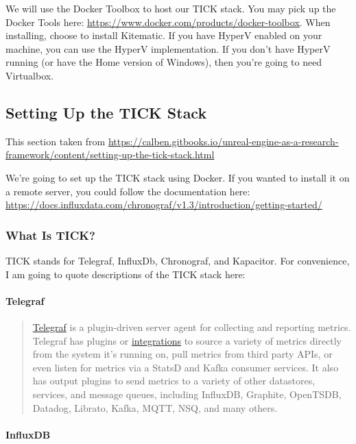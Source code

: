 We will use the Docker Toolbox to host our TICK stack. You may pick up
the Docker Tools here:
\url{https://www.docker.com/products/docker-toolbox}. When installing,
choose to install Kitematic. If you have HyperV enabled on your machine,
you can use the HyperV implementation. If you don't have HyperV running
(or have the Home version of Windows), then you're going to need
Virtualbox.

\subsection{Setting Up the TICK Stack}\label{setting-up-the-tick-stack}

This section taken from
\url{https://calben.gitbooks.io/unreal-engine-as-a-research-framework/content/setting-up-the-tick-stack.html}

We're going to set up the TICK stack using Docker. If you wanted to
install it on a remote server, you could follow the documentation here:
\url{https://docs.influxdata.com/chronograf/v1.3/introduction/getting-started/}

\subsubsection{What Is TICK?}\label{what-is-tick}

TICK stands for Telegraf, InfluxDb, Chronograf, and Kapacitor. For
convenience, I am going to quote descriptions of the TICK stack here:

\paragraph{Telegraf}\label{telegraf}

\begin{quote}
\href{https://www.influxdata.com/time-series-platform/telegraf/}{Telegraf}
is a plugin-driven server agent for collecting and reporting metrics.
Telegraf has plugins or
\href{https://www.influxdata.com/products/integrations/}{integrations}
to source a variety of metrics directly from the system it's running on,
pull metrics from third party APIs, or even listen for metrics via a
StatsD and Kafka consumer services. It also has output plugins to send
metrics to a variety of other datastores, services, and message queues,
including InfluxDB, Graphite, OpenTSDB, Datadog, Librato, Kafka, MQTT,
NSQ, and many others.
\end{quote}

\paragraph{InfluxDB}\label{influxdb}

